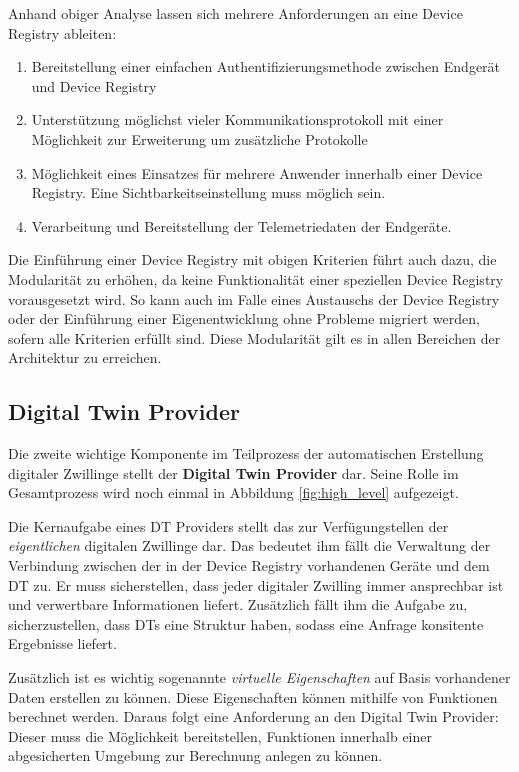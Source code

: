 Anhand obiger Analyse lassen sich mehrere Anforderungen an eine Device Registry ableiten:

\begin{enumerate}
    \item Bereitstellung einer einfachen Authentifizierungsmethode zwischen Endgerät und Device Registry
    \item Unterstützung möglichst vieler Kommunikationsprotokoll mit einer Möglichkeit zur Erweiterung um zusätzliche Protokolle
    \item Möglichkeit eines Einsatzes für mehrere Anwender innerhalb einer Device Registry. Eine Sichtbarkeitseinstellung muss möglich sein.
    \item Verarbeitung und Bereitstellung der Telemetriedaten der Endgeräte.
\end{enumerate}

Die Einführung einer Device Registry mit obigen Kriterien führt auch dazu, die Modularität zu erhöhen, da keine Funktionalität einer speziellen Device Registry vorausgesetzt wird. So kann auch im Falle eines Austauschs der Device Registry oder der Einführung einer Eigenentwicklung ohne Probleme migriert werden, sofern alle Kriterien erfüllt sind. Diese Modularität gilt es in allen Bereichen der Architektur zu erreichen.

\subsection{Digital Twin Provider}
\label{sec:dtp}

Die zweite wichtige Komponente im Teilprozess der automatischen Erstellung digitaler Zwillinge stellt der \textbf{Digital Twin Provider} dar. Seine Rolle im Gesamtprozess wird noch einmal in Abbildung \vref{fig:high_level} aufgezeigt.

Die Kernaufgabe eines \ac{DT} Providers stellt das zur Verfügungstellen der \textit{eigentlichen} digitalen Zwillinge dar. Das bedeutet ihm fällt die Verwaltung der Verbindung zwischen der in der Device Registry vorhandenen Geräte und dem \ac{DT} zu. Er muss sicherstellen, dass jeder digitaler Zwilling immer ansprechbar ist und verwertbare Informationen liefert. Zusätzlich fällt ihm die Aufgabe zu, sicherzustellen, dass \ac{DT}s eine Struktur haben, sodass eine Anfrage konsitente Ergebnisse liefert.

Zusätzlich ist es wichtig sogenannte \textit{virtuelle Eigenschaften} auf Basis vorhandener Daten erstellen zu können. Diese Eigenschaften können mithilfe von Funktionen berechnet werden. Daraus folgt eine Anforderung an den Digital Twin Provider: Dieser muss die Möglichkeit bereitstellen, Funktionen innerhalb einer abgesicherten Umgebung zur Berechnung anlegen zu können.

